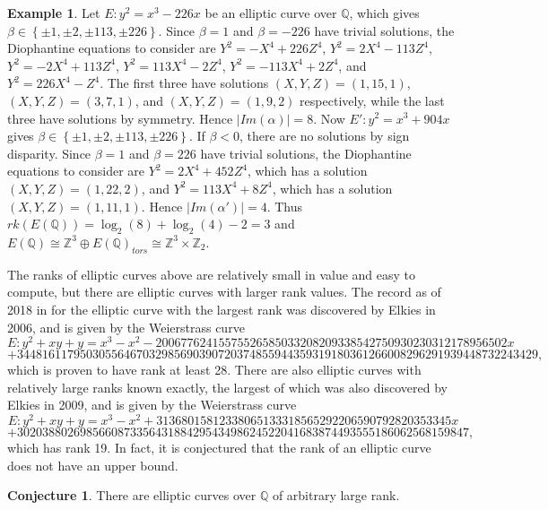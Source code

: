 \documentclass{article}
\newcommand{\Z}{\mathbb{Z}}
\newcommand{\Q}{\mathbb{Q}}
\newcommand{\rb}[1]{\left( #1 \right)}
\newcommand{\cb}[1]{\left\{ #1 \right\}}
\newcommand{\abs}[1]{\left\lvert #1 \right\rvert}
\theoremstyle{definition}\newtheorem*{definition}{Definition}
\theoremstyle{definition}\newtheorem*{example}{Example}
\theoremstyle{definition}\newtheorem*{remark}{Remark}
\newtheorem{conjecture}[proposition]{Conjecture}
\begin{document}
\begin{example}
Let $ E : y^2 = x^3 - 226x $ be an elliptic curve over $ \Q $, which gives $ \beta \in \cb{\pm 1, \pm 2, \pm 113, \pm 226} $. Since $ \beta = 1 $ and $ \beta = -226 $ have trivial solutions, the Diophantine equations to consider are $ Y^2 = -X^4 + 226Z^4 $, $ Y^2 = 2X^4 - 113Z^4 $, $ Y^2 = -2X^4 + 113Z^4 $, $ Y^2 = 113X^4 - 2Z^4 $, $ Y^2 = -113X^4 + 2Z^4 $, and $ Y^2 = 226X^4 - Z^4 $. The first three have solutions $ \rb{X, Y, Z} = \rb{1, 15, 1} $, $ \rb{X, Y, Z} = \rb{3, 7, 1} $, and $ \rb{X, Y, Z} = \rb{1, 9, 2} $ respectively, while the last three have solutions by symmetry. Hence $ \abs{Im\rb{\alpha}} = 8 $. Now $ E' : y^2 = x^3 + 904x $ gives $ \beta \in \cb{\pm 1, \pm 2, \pm 113, \pm 226} $. If $ \beta < 0 $, there are no solutions by sign disparity. Since $ \beta = 1 $ and $ \beta = 226 $ have trivial solutions, the Diophantine equations to consider are $ Y^2 = 2X^4 + 452Z^4 $, which has a solution $ \rb{X, Y, Z} = \rb{1, 22, 2} $, and $ Y^2 = 113X^4 + 8Z^4 $, which has a solution $ \rb{X, Y, Z} = \rb{1, 11, 1} $. Hence $ \abs{Im\rb{\alpha'}} = 4 $. Thus $ rk\rb{E\rb{\Q}} = \log_2\rb{8} + \log_2\rb{4} - 2 = 3 $ and $ E\rb{\Q} \cong \Z^3 \oplus E\rb{\Q}_{tors} \cong \Z^3 \times \Z_2 $.
\end{example}

The ranks of elliptic curves above are relatively small in value and easy to compute, but there are elliptic curves with larger rank values. The record as of 2018 in \cite{rankhistory} for the elliptic curve with the largest rank was discovered by Elkies in 2006, and is given by the Weierstrass curve
$$ E : y^2 + xy + y = x^3 - x^2 - 20067762415575526585033208209338542750930230312178956502x $$
$$ + 34481611795030556467032985690390720374855944359319180361266008296291939448732243429, $$
which is proven to have rank at least 28. There are also elliptic curves with relatively large ranks known exactly, the largest of which was also discovered by Elkies in 2009, and is given by the Weierstrass curve
$$ E : y^2 + xy + y = x^3 - x^2 + 31368015812338065133318565292206590792820353345x $$
$$ + 302038802698566087335643188429543498624522041683874493555186062568159847, $$
which has rank 19. In fact, it is conjectured that the rank of an elliptic curve does not have an upper bound.

\begin{conjecture}
There are elliptic curves over $ \Q $ of arbitrary large rank.
\end{conjecture}
\end{document}
